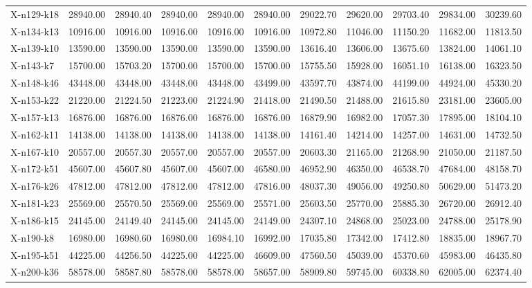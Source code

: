 \documentclass[letterpaper]{article} %
\begin{document}
\begin{longtable}{@{}l rr rr rr rr rr@{}}
X-n129-k18 & 28940.00 & 28940.40 & 28940.00 & 28940.00 & 28940.00 & 29022.70 & 29620.00 & 29703.40 & 29834.00 & 30239.60 \\
X-n134-k13 & 10916.00 & 10916.00 & 10916.00 & 10916.00 & 10916.00 & 10972.80 & 11046.00 & 11150.20 & 11682.00 & 11813.50 \\
X-n139-k10 & 13590.00 & 13590.00 & 13590.00 & 13590.00 & 13590.00 & 13616.40 & 13606.00 & 13675.60 & 13824.00 & 14061.10 \\
X-n143-k7 & 15700.00 & 15703.20 & 15700.00 & 15700.00 & 15700.00 & 15755.50 & 15928.00 & 16051.10 & 16138.00 & 16323.50 \\
X-n148-k46 & 43448.00 & 43448.00 & 43448.00 & 43448.00 & 43499.00 & 43597.70 & 43874.00 & 44199.00 & 44924.00 & 45330.20 \\
X-n153-k22 & 21220.00 & 21224.50 & 21223.00 & 21224.90 & 21418.00 & 21490.50 & 21488.00 & 21615.80 & 23181.00 & 23605.00 \\
X-n157-k13 & 16876.00 & 16876.00 & 16876.00 & 16876.00 & 16876.00 & 16879.90 & 16982.00 & 17057.30 & 17895.00 & 18104.10 \\
X-n162-k11 & 14138.00 & 14138.00 & 14138.00 & 14138.00 & 14138.00 & 14161.40 & 14214.00 & 14257.00 & 14631.00 & 14732.50 \\
X-n167-k10 & 20557.00 & 20557.30 & 20557.00 & 20557.00 & 20557.00 & 20603.30 & 21165.00 & 21268.90 & 21050.00 & 21187.50 \\
X-n172-k51 & 45607.00 & 45607.80 & 45607.00 & 45607.00 & 46580.00 & 46952.90 & 46350.00 & 46538.70 & 47684.00 & 48158.70 \\
X-n176-k26 & 47812.00 & 47812.00 & 47812.00 & 47812.00 & 47816.00 & 48037.30 & 49056.00 & 49250.80 & 50629.00 & 51473.20 \\
X-n181-k23 & 25569.00 & 25570.50 & 25569.00 & 25569.00 & 25571.00 & 25603.50 & 25770.00 & 25885.30 & 26720.00 & 26912.40 \\
X-n186-k15 & 24145.00 & 24149.40 & 24145.00 & 24145.00 & 24149.00 & 24307.10 & 24868.00 & 25023.00 & 24788.00 & 25178.90 \\
X-n190-k8 & 16980.00 & 16980.60 & 16980.00 & 16984.10 & 16992.00 & 17035.80 & 17342.00 & 17412.80 & 18835.00 & 18967.70 \\
X-n195-k51 & 44225.00 & 44256.50 & 44225.00 & 44225.00 & 46609.00 & 47560.50 & 45039.00 & 45370.60 & 45983.00 & 46435.80 \\
X-n200-k36 & 58578.00 & 58587.80 & 58578.00 & 58578.00 & 58657.00 & 58909.80 & 59745.00 & 60338.80 & 62005.00 & 62374.40 \\

\end{longtable}
\end{document}
